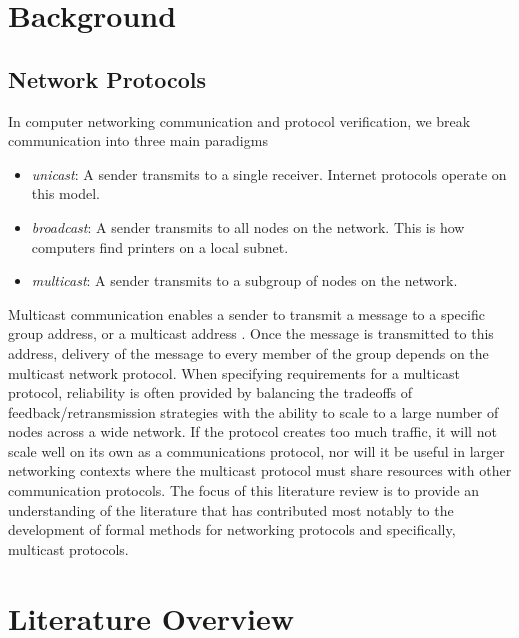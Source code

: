 \documentclass[10pt, journal]{IEEEtran}
\begin{document}
\section{Background}
\bigbreak
\subsection{Network Protocols}
In computer networking communication and protocol verification, we break communication into three main paradigms
\begin{itemize}
	\item \textit{unicast}: A sender transmits to a single receiver. Internet protocols operate on this model.
	\item \textit{broadcast}: A sender transmits to all nodes on the network. This is how computers find printers on a local subnet.
	\item \textit{multicast}: A sender transmits to a subgroup of nodes on the network.
\end{itemize}
\bigbreak
Multicast communication enables a sender to transmit a message to a specific group address, or a multicast address \cite{Lien2004FormalMA}. Once the message is transmitted to this address, delivery of the message to every member of the group depends on the multicast network protocol. When specifying requirements for a multicast protocol, reliability is often provided by balancing the tradeoffs of feedback/retransmission strategies with the ability to scale to a large number of nodes across a wide network. If the protocol creates too much traffic, it will not scale well on its own as a communications protocol, nor will it be useful in larger networking contexts where the multicast protocol must share resources with other communication protocols. The focus of this literature review is to provide an understanding of the literature that has contributed most notably to the development of formal methods for networking protocols and specifically, multicast protocols.

\section{Literature Overview}
\bigbreak
\end{document}
